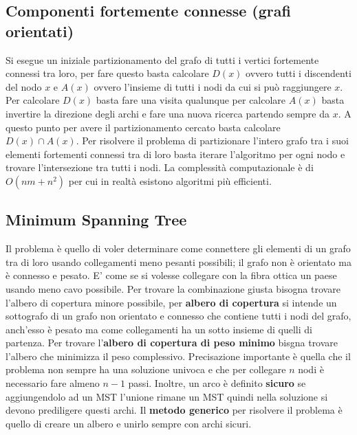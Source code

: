 \documentclass{article}
\begin{document}
\subsection{Componenti fortemente connesse (grafi orientati)}
Si esegue un iniziale partizionamento del grafo di tutti i vertici fortemente connessi tra loro, per fare questo basta calcolare $D(x)$ ovvero tutti i discendenti del nodo $x$ e $A(x)$ ovvero l'insieme di tutti i nodi da cui si può raggiungere $x$.
Per calcolare $D(x)$ basta fare una visita qualunque per calcolare $A(x)$ basta invertire la direzione degli archi e fare una nuova ricerca partendo sempre da $x$.
A questo punto per avere il partizionamento cercato basta calcolare $D(x) \cap A(x)$.
Per risolvere il problema di partizionare l'intero grafo tra i suoi elementi fortementi connessi tra di loro basta iterare l'algoritmo per ogni nodo e trovare l'intersezione tra tutti i nodi.
La complessità computazionale è di $O(nm+n^2)$ per cui in realtà esistono algoritmi più efficienti.


\subsection{Minimum Spanning Tree}
Il problema è quello di voler determinare come connettere gli elementi di un grafo tra di loro usando collegamenti meno pesanti possibili; il grafo non è orientato ma è connesso e pesato. 
E' come se si volesse collegare con la fibra ottica un paese usando meno cavo possibile.
Per trovare la combinazione giusta bisogna trovare l'albero di copertura minore possibile, per \textbf{albero di copertura} si intende un sottografo di un grafo non orientato e connesso che contiene tutti i nodi del grafo, anch'esso è pesato ma come collegamenti ha un sotto insieme di quelli di partenza.
Per trovare l'\textbf{albero di copertura di peso minimo} bisgna trovare l'albero che minimizza il peso complessivo. 
Precisazione importante è quella che il problema non sempre ha una soluzione univoca e che per collegare $n$ nodi è necessario fare almeno $n-1$ passi. 
Inoltre, un arco è definito \textbf{sicuro} se aggiungendolo ad un MST l'unione rimane un MST quindi nella soluzione si devono prediligere questi archi.
Il \textbf{metodo generico} per risolvere il problema è quello di creare un albero e unirlo sempre con archi sicuri.
\end{document}
